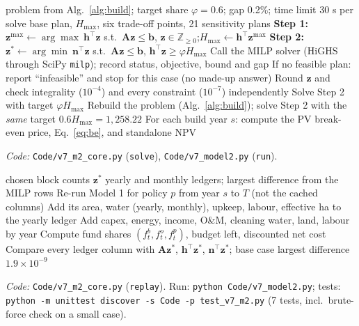 \documentclass[11pt,a4paper]{article}
\begin{document}
\begin{algorithm}[H]
\caption{Two-step $\varepsilon$-constraint solution, trade-off points and sensitivity}\label{alg:solve}
\begin{algorithmic}[1]
\Require problem from Alg.~\ref{alg:build}; target share $\varphi=0.6$; gap 0.2\%; time limit 30 s per solve
\Ensure base plan, $H_{\max}$, six trade-off points, 21 sensitivity plans
\State \textbf{Step 1:} $\bm z^{\max}\gets\arg\max\ \bm h^\top\bm z$ s.t.\ $\bm A\bm z\le\bm b$, $\bm z\in\mathbb Z_{\ge0}$;\quad $H_{\max}\gets\bm h^\top\bm z^{\max}$
\State \textbf{Step 2:} $\bm z^*\gets\arg\min\ \bm n^\top\bm z$ s.t.\ $\bm A\bm z\le\bm b$, $\bm h^\top\bm z\ge\varphi H_{\max}$ 
  \State Call the MILP solver (HiGHS through SciPy \texttt{milp}); record status, objective, bound and gap
  \State If no feasible plan: report ``infeasible'' and stop for this case (no made-up answer)
  \State Round $\bm z$ and check integrality ($10^{-4}$) and every constraint ($10^{-7}$) independently
\EndFor
{}
  \State Solve Step 2 with target $\varphi H_{\max}$ 
\EndFor
{}
  \State Rebuild the problem (Alg.~\ref{alg:build}); solve Step 2 with the \emph{same} target $0.6H_{\max}=1{,}258.22$ 
\EndFor
\State For each build year $s$: compute the PV break-even price, Eq.~\eqref{eq:be}, and standalone NPV 
\end{algorithmic}
\end{algorithm}
\noindent\textit{Code:} \texttt{Code/v7\_m2\_core.py} (\texttt{solve}), \texttt{Code/v7\_model2.py} (\texttt{run}).

\begin{algorithm}[H]
\caption{Replay check of a solved plan}\label{alg:replay}
\begin{algorithmic}[1]
\Require chosen block counts $\bm z^*$
\Ensure yearly and monthly ledgers; largest difference from the MILP rows
  \State Re-run Model 1 for policy $p$ from year $s$ to $T$ (not the cached columns)
  \State Add its area, water (yearly, monthly), upkeep, labour, effective ha to the yearly ledger
\EndFor
{}
  \State Add capex, energy, income, O\&M, cleaning water, land, labour by year
\EndFor
\State Compute fund shares $(f^b_t,f^o_t,f^p_t)$, budget left, discounted net cost
\State Compare every ledger column with $\bm A\bm z^*$, $\bm h^\top\bm z^*$, $\bm n^\top\bm z^*$; base case largest difference $1.9\times10^{-9}$
\end{algorithmic}
\end{algorithm}
\noindent\textit{Code:} \texttt{Code/v7\_m2\_core.py} (\texttt{replay}). Run: \texttt{python Code/v7\_model2.py};
tests: \texttt{python -m unittest discover -s Code -p test\_v7\_m2.py} (7 tests, incl.\ brute-force check on a small case).
\end{document}
